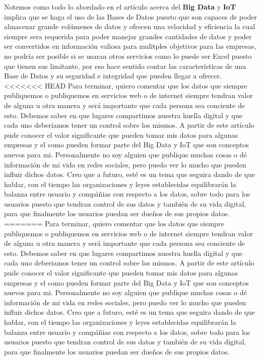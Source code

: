 \documentclass[12pt]{report}
\begin{document}
\begin{enumerate}[label=\textbf{\arabic*.}, leftmargin=*]
\begin{enumerate}[label=\textbf{\alph*.}, leftmargin=*, itemsep=1.0em]
Notemos como todo lo abordado en el artículo acerca del \textbf{Big Data} y \textbf{IoT} implica que se haga el uso de las Bases de Datos puesto que son capaces de poder almacenar grande volúmenes de datos y ofrecen una velocidad y eficiencia la cual siempre sera requerida para poder manejar grandes cantidades de datos y poder ser convertidos en información valiosa para mulitples objetivos para las empresas, no podría ser posible si se usaran otros servicios como lo puede ser Excel puesto que tienen sus limitante, por eso hace sentido contar las características de una Base de Datos y su seguridad e integridad que pueden llegar a ofrecer. \\

<<<<<<< HEAD
Para terminar, quiero comentar que los datos que siempre publiquemos o publiquemos en servicios web o de internet siempre tendran valor de alguna u otra manera y será importante que cada persona sea conciente de esto. Debemos saber en que lugares compartimos nuestra huella digital y que cada uno deberiamos tener un control sobre los mismos. A partir de este artículo pude conocer el valor significante que pueden tomar mis datos para algunas empresas y el como pueden formar parte del Big Data y IoT que son conceptos nuevos para mi. Personalmente no soy alguien que publique muchas cosas o dé información de mi vida en redes sociales, pero puedo ver lo mucho que pueden influir dichos datos. Creo que a futuro, esté es un tema que seguira dando de que hablar, con el tiempo las organizaciones y leyes establecidas equilibrarán la balanza entre usuario y compáñias con respecto a los datos, sobre todo para los usuarios puesto que tendran control de sus datos y también de su vida digital, para que finalmente los usuarios puedan ser dueños de sus propios datos.
=======
Para terminar, quiero comentar que los datos que siempre publiquemos o publiquemos en servicios web o de internet siempre tendran valor de alguna u otra manera y será importante que cada persona sea conciente de esto. Debemos saber en que lugares compartimos nuestra huella digital y que cada uno deberiamos tener un control sobre los mismos. A partir de este artículo pude conocer el valor significante que pueden tomar mis datos para algunas empresas y el como pueden formar parte del Big Data y IoT que son conceptos nuevos para mi. Personalmente no soy alguien que publique muchas cosas o dé información de mi vida en redes sociales, pero puedo ver lo mucho que pueden influir dichos datos. Creo que a futuro, esté es un tema que seguira dando de que hablar, con el tiempo las organizaciones y leyes establecidas equilibrarán la balanza entre usuario y compáñias con respecto a los datos, sobre todo para los usuarios puesto que tendran control de sus datos y también de su vida digital, para que finalmente los usuarios puedan ser dueños de sus propios datos. 


\end{enumerate}
\end{enumerate}
\end{document}

